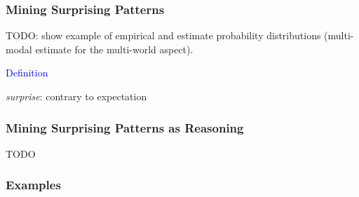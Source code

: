 \documentclass{beamer}
\begin{document}
\begin{frame}
  \frametitle{Mining Surprising Patterns}




TODO: show example of empirical and estimate probability distributions
(multi-modal estimate for the multi-world aspect).



  \textcolor{blue}{Definition}
  \begin{center}\emph{surprise}: \alert{contrary to expectation}\end{center}
\end{frame}

\begin{frame}
  \frametitle{Mining Surprising Patterns as Reasoning}
  TODO
\end{frame}

\begin{frame}
  \frametitle{Examples}
\end{frame}
\end{document}
